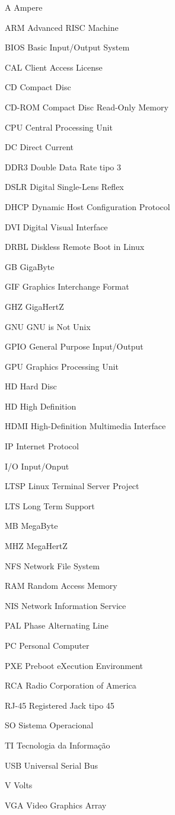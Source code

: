 \documentclass[
	12pt,				%
	openright,			%
	twoside,			%
	a4paper,			%
	chapter=TITLE,		%
	english,			%
	brazil				%
	]{abntex2}
\begin{document}
\begin{siglas}						
\item[A] Ampere
\item[ARM] Advanced RISC Machine
\item[BIOS] Basic Input/Output System
\item[CAL] Client Access License
\item[CD] Compact Disc
\item[CD-ROM] Compact Disc Read-Only Memory
\item[CPU] Central Processing Unit
\item[DC] Direct Current
\item[DDR3] Double Data Rate tipo 3 
\item[DSLR] Digital Single-Lens Reflex
\item[DHCP] Dynamic Host Configuration Protocol
\item[DVI] Digital Visual Interface
\item[DRBL] Diskless Remote Boot in Linux
\item[GB] GigaByte
\item[GIF] Graphics Interchange Format
\item[GHZ] GigaHertZ
\item[GNU] GNU is Not Unix
\item[GPIO] General Purpose Input/Output
\item[GPU] Graphics Processing Unit
\item[HD] Hard Disc
\item[HD] High Definition
\item[HDMI] High-Definition Multimedia Interface
\item[IP] Internet Protocol
\item[I/O] Input/Onput
\item[LTSP] Linux Terminal Server Project
\item[LTS] Long Term Support
\item[MB] MegaByte
\item[MHZ] MegaHertZ
\item[NFS] Network File System
\item[RAM] Random Access Memory
\item[NIS] Network Information Service
\item[PAL] Phase Alternating Line
\item[PC] Personal Computer
\item[PXE] Preboot eXecution Environment
\item[RCA] Radio Corporation of America
\item[RJ-45] Registered Jack tipo 45
\item[SO] Sistema Operacional
\item[TI] Tecnologia da Informação
\item[USB] Universal Serial Bus
\item[V] Volts
\item[VGA] Video Graphics Array
\end{siglas}
\end{document}
